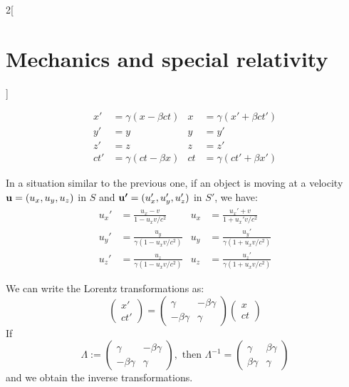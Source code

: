 \documentclass[../../../main_physics.tex]{subfiles}
\begin{document}
\begin{multicols}{2}[\section{Mechanics and special relativity}]
\begin{proposition}
\begin{align*}
      x'  & =\gamma(x-\beta ct) & x  & =\gamma(x'+\beta ct') \\
      y'  & =y                  & y  & =y'                   \\
      z'  & =z                  & z  & =z'                   \\
      ct' & =\gamma(ct-\beta x) & ct & =\gamma(ct'+\beta x')
    \end{align*}
  \end{proposition}
  \begin{proposition}
    In a situation similar to the previous one, if an object is moving at a velocity $\boldsymbol{\mathrm{u}}=(u_x,u_y,u_z)$ in $S$ and $\boldsymbol{\mathrm{u'}}=(u_x',u_y',u_z')$ in $S'$, we have:
    \begin{align*}
      u_x' & =\frac{u_x-v}{1-u_xv/c^2}                   & u_x & =\frac{u_x'+v}{1+u_x'v/c^2}                  \\
      u_y' & =\frac{u_y}{\gamma \left(1-u_xv/c^2\right)} & u_y & =\frac{u_y'}{\gamma \left(1+u_xv/c^2\right)} \\
      u_z' & =\frac{u_z}{\gamma \left(1-u_xv/c^2\right)} & u_z & =\frac{u_z'}{\gamma \left(1+u_xv/c^2\right)}
    \end{align*}
  \end{proposition}
  \begin{proposition}
    We can write the Lorentz transformations as:
    $$\begin{pmatrix}
        x' \\
        ct'
      \end{pmatrix}=\begin{pmatrix}
        \gamma       & -\beta\gamma \\
        -\beta\gamma & \gamma
      \end{pmatrix}\begin{pmatrix}
        x \\
        ct
      \end{pmatrix}$$ If $$\Lambda:=\begin{pmatrix}
        \gamma       & -\beta\gamma \\
        -\beta\gamma & \gamma
      \end{pmatrix},\text{ then }\Lambda^{-1}=\begin{pmatrix}
        \gamma      & \beta\gamma \\
        \beta\gamma & \gamma
      \end{pmatrix}$$ and we obtain the inverse transformations.

\end{proposition}
\end{multicols}
\end{document}
